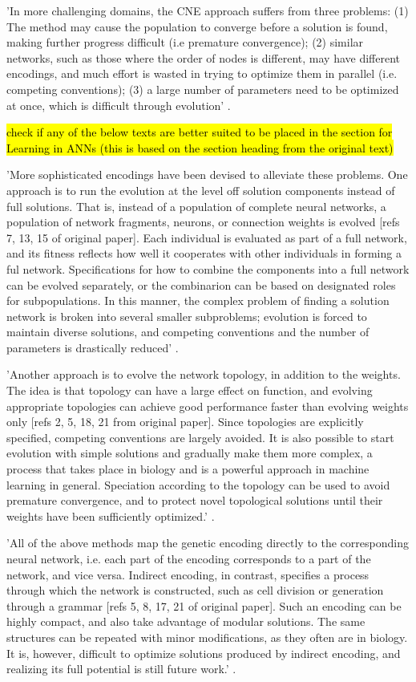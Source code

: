 'In more challenging domains, the CNE approach suffers from three problems: (1) The method may cause the population to converge before a solution is found, making further progress difficult (i.e premature convergence); (2) similar networks, such as those where the order of nodes is different, may have different encodings, and much effort is wasted in trying to optimize them in parallel (i.e. competing conventions); (3) a large number of parameters need to be optimized at once, which is difficult through evolution' \cite{Miikkulainen2010}.

\hl{check if any of the below texts are better suited to be placed in the section for Learning in ANNs (this is based on the section heading from the original text)}

'More sophisticated encodings have been devised to alleviate these problems. One approach is to run the evolution at the level off solution components instead of full solutions. That is, instead of a population of complete neural networks, a population of network fragments, neurons, or connection weights is evolved [refs 7, 13, 15 of original paper]. Each individual is evaluated as part of a full network, and its fitness reflects how well it cooperates with other individuals in forming a ful network. Specifications for how to combine the components into a full network can be evolved separately, or the combinarion can be based on designated roles for subpopulations. In this manner, the complex problem of finding a solution network is broken into several smaller subproblems; evolution is forced to maintain diverse solutions, and competing conventions and the number of parameters is drastically reduced' \cite{Miikkulainen2010}.


'Another approach is to evolve the network topology, in addition to the weights. The idea is that topology can have a large effect on function, and evolving appropriate topologies can achieve good performance faster than evolving weights only [refs 2, 5, 18, 21 from original paper]. Since topologies are explicitly specified, competing conventions are largely avoided. It is also possible to start evolution with simple solutions and gradually make them more complex, a process that takes place in biology and is a powerful approach in machine learning in general. Speciation according to the topology can be used to avoid premature convergence, and to protect novel topological solutions until their weights have been sufficiently optimized.' \cite{Miikkulainen2010}.

'All of the above methods map the genetic encoding directly to the corresponding neural network, i.e. each part of the encoding corresponds to a part of the network, and vice versa. Indirect encoding, in contrast, specifies a process through which the network is constructed, such as cell division or generation through a grammar [refs 5, 8, 17, 21 of original paper]. Such an encoding can be highly compact, and also take advantage of modular solutions. The same structures can be repeated with minor modifications, as they often are in biology. It is, however, difficult to optimize solutions produced by indirect encoding, and realizing its full potential is still future work.' \cite{Miikkulainen2010}.

